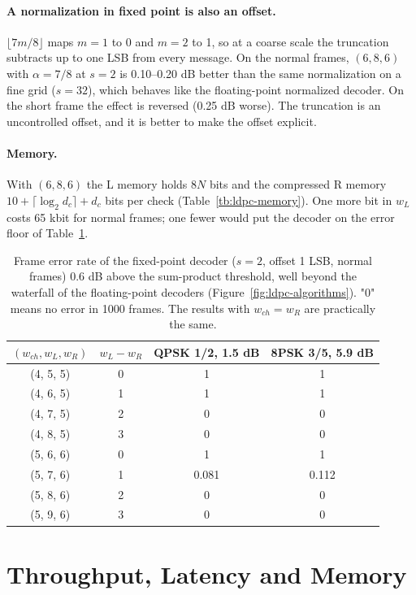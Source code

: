\paragraph{A normalization in fixed point is also an offset.} \(\lfloor 7m/8 \rfloor\) maps \(m = 1\) to 0 and \(m = 2\) to 1, so at a coarse scale the truncation subtracts up to one LSB from every message. On the normal frames, \((6, 8, 6)\) with \(\alpha = 7/8\) at \(s = 2\) is 0.10--0.20 dB better than the same normalization on a fine grid (\(s = 32\)), which behaves like the floating-point normalized decoder. On the short frame the effect is reversed (0.25 dB worse). The truncation is an uncontrolled offset, and it is better to make the offset explicit.

\paragraph{Memory.} With \((6, 8, 6)\) the L memory holds \(8N\) bits and the compressed R memory \(10 + \lceil\log_2 d_c\rceil + d_c\) bits per check (Table~\ref{tb:ldpc-memory}). One more bit in \(w_L\) costs 65 kbit for normal frames; one fewer would put the decoder on the error floor of Table~\ref{tb:ldpc-headroom}.

\begin{table} \centering
\begin{tabular}{|c|c|c|c|}
\hline
\((w_{ch}, w_L, w_R)\) & \(w_L - w_R\) & QPSK 1/2, 1.5 dB & 8PSK 3/5, 5.9 dB \\
\hline
(4, 5, 5) & 0 & 1 & 1 \\
(4, 6, 5) & 1 & 1 & 1 \\
(4, 7, 5) & 2 & 0 & 0 \\
(4, 8, 5) & 3 & 0 & 0 \\
(5, 6, 6) & 0 & 1 & 1 \\
(5, 7, 6) & 1 & 0.081 & 0.112 \\
(5, 8, 6) & 2 & 0 & 0 \\
(5, 9, 6) & 3 & 0 & 0 \\
\hline
\end{tabular}
\caption{Frame error rate of the fixed-point decoder (\(s = 2\), offset 1 LSB, normal frames) 0.6 dB above the sum-product threshold, well beyond the waterfall of the floating-point decoders (Figure~\ref{fig:ldpc-algorithms}). "0" means no error in 1000 frames. The results with \(w_{ch} = w_R\) are practically the same.} \label{tb:ldpc-headroom}
\end{table}

\section{Throughput, Latency and Memory} \label{sec:ldpc-perf}


